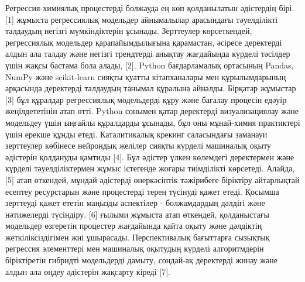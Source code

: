 Регрессия-химиялық процестерді болжауда ең көп қолданылатын әдістердің
бірі. {[}1{]} жұмыста регрессиялық модельдер айнымалылар арасындағы
тәуелділікті талдаудың негізгі мүмкіндіктерін ұсынады. Зерттеулер
көрсеткендей, регрессиялық модельдер қарапайымдылығына қарамастан,
әсіресе деректерді алдын ала талдау және негізгі трендтерді анықтау
жағдайында күрделі тәсілдер үшін жақсы бастама бола алады, {[}2{]}.
Python бағдарламалық ортасының Pandas, NumPy және scikit-learn сияқты
қуатты кітапханалары мен құрылымдарының арқасында деректерді талдаудың
танымал құралына айналды. Бірқатар жұмыстар {[}3{]} бұл құралдар
регрессиялық модельдерді құру және бағалау процесін едәуір
жеңілдететінін атап өтті. Python сонымен қатар деректерді
визуализациялау және модельдеу үшін ыңғайлы құралдарды ұсынады, бұл оны
мұнай-химия практиктері үшін ерекше құнды етеді. Каталитикалық крекинг
саласындағы заманауи зерттеулер көбінесе нейрондық желілер сияқты
күрделі машиналық оқыту әдістерін қолдануды қамтиды {[}4{]}. Бұл әдістер
үлкен көлемдегі деректермен және күрделі тәуелділіктермен жұмыс
істегенде жоғары тиімділікті көрсетеді. Алайда, {[}5{]} атап өткендей,
мұндай әдістерді өнеркәсіптік тәжірибеге біріктіру айтарлықтай есептеу
ресурстарын және процестерді терең түсінуді қажет етеді. Қосымша
зерттеуді қажет ететін маңызды аспектілер - болжамдардың дәлдігі және
нәтижелерді түсіндіру. {[}6{]} ғылыми жұмыста атап өткендей,
қолданыстағы модельдер өзгеретін процестер жағдайында қайта оқыту және
дәлдіктің жеткіліксіздігімен жиі ұшырасады. Перспективалық бағыттарға
сызықтық регрессия элементтері мен машиналық оқытудың күрделі
алгоритмдерін біріктіретін гибридті модельдерді дамыту, сондай-ақ
деректерді жинау және алдын ала өңдеу әдістерін жақсарту кіреді {[}7{]}.

